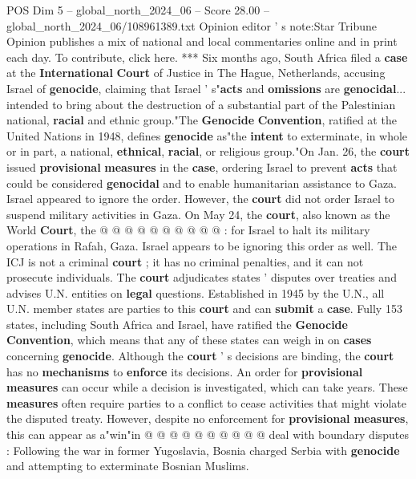 \begin{textsample}{POS Dim 5 – global\_north\_2024\_06 – Score 28.00 – global\_north\_2024\_06/108961389.txt}  \label{ex:f5_pos_371}
Opinion editor ' s note:Star Tribune Opinion publishes a mix of national and local commentaries online and in print each day.
To contribute, click here. *** Six months ago, South Africa filed a \textbf{case} at the \textbf{International} \textbf{Court} of Justice in The Hague, Netherlands, accusing Israel of \textbf{genocide}, claiming that Israel ' s"\textbf{acts} and \textbf{omissions} are \textbf{genocidal}... intended to bring about the destruction of a substantial part of the Palestinian national, \textbf{racial} and ethnic group."The \textbf{Genocide} \textbf{Convention}, ratified at the United Nations in 1948, defines \textbf{genocide} as"the \textbf{intent} to exterminate, in whole or in part, a national, \textbf{ethnical}, \textbf{racial}, or religious group."On Jan. 26, the \textbf{court} issued \textbf{provisional} \textbf{measures} in the \textbf{case}, ordering Israel to prevent \textbf{acts} that could be considered \textbf{genocidal} and to enable humanitarian assistance to Gaza.
Israel appeared to ignore the order.
However, the \textbf{court} did not order Israel to suspend military activities in Gaza.
On May 24, the \textbf{court}, also known as the World \textbf{Court}, the @ @ @ @ @ @ @ @ @ @ : for Israel to halt its military operations in Rafah, Gaza.
Israel appears to be ignoring this order as well.
The ICJ is not a criminal \textbf{court} ; it has no criminal penalties, and it can not prosecute individuals.
The \textbf{court} adjudicates states ' disputes over treaties and advises U.N. entities on \textbf{legal} questions.
Established in 1945 by the U.N., all U.N. member states are parties to this \textbf{court} and can \textbf{submit} a \textbf{case}.
Fully 153 states, including South Africa and Israel, have ratified the \textbf{Genocide} \textbf{Convention}, which means that any of these states can weigh in on \textbf{cases} concerning \textbf{genocide}.
Although the \textbf{court} ' s decisions are binding, the \textbf{court} has no \textbf{mechanisms} to \textbf{enforce} its decisions.
An order for \textbf{provisional} \textbf{measures} can occur while a decision is investigated, which can take years.
These \textbf{measures} often require parties to a conflict to cease activities that might violate the disputed treaty.
However, despite no enforcement for \textbf{provisional} \textbf{measures}, this can appear as a"win"in @ @ @ @ @ @ @ @ @ @ deal with boundary disputes : Following the war in former Yugoslavia, Bosnia charged Serbia with \textbf{genocide} and attempting to exterminate Bosnian Muslims.

\end{textsample}
